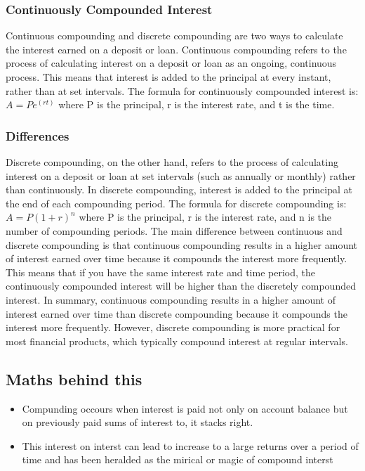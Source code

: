 \documentclass{article}
\theoremstyle{mytheoremstyle}
\theoremstyle{mytheoremstyle}
\theoremstyle{myproblemstyle}
\begin{document}
\subsubsection{Continuously Compounded Interest}
\begin{definition}

	Continuous compounding and discrete compounding are two ways to calculate the interest earned on a deposit or loan.
	Continuous compounding refers to the process of calculating interest on a deposit or loan as an ongoing, continuous process. This means that interest is added to the principal at every instant, rather than at set intervals. The formula for continuously compounded interest is: $A = Pe^{(rt)}$ where P is the principal, r is the interest rate, and t is the time.

\end{definition}


\subsubsection{Differences}
Discrete compounding, on the other hand, refers to the process of calculating interest on a deposit or loan at set intervals (such as annually or monthly) rather than continuously. In discrete compounding, interest is added to the principal at the end of each compounding period. The formula for discrete compounding is: $A = P(1+r)^n$ where P is the principal, r is the interest rate, and n is the number of compounding periods.
The main difference between continuous and discrete compounding is that continuous compounding results in a higher amount of interest earned over time because it compounds the interest more frequently. This means that if you have the same interest rate and time period, the continuously compounded interest will be higher than the discretely compounded interest.
In summary, continuous compounding results in a higher amount of interest earned over time than discrete compounding because it compounds the interest more frequently. However, discrete compounding is more practical for most financial products, which typically compound interest at regular intervals.


\subsection{Maths behind this}

\begin{itemize}
	\item Compunding occours when interest is paid not only on account balance but on previously paid sums of interest to, it stacks right.
	\item This interest on interst can lead to increase to a large returns over a period of time and has been heralded as the mirical or magic of compound interst
\end{itemize}
\end{document}
